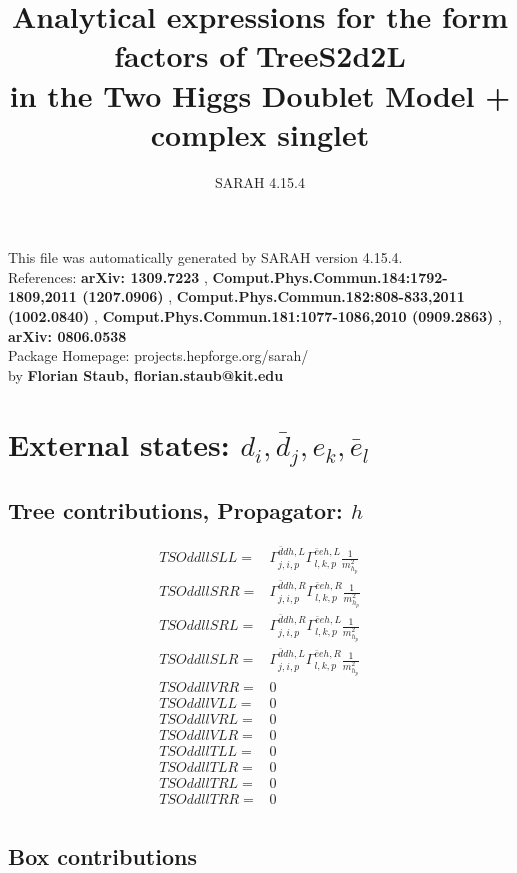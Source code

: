\documentclass[A4,landscape]{article}
\begin{document}
\title{Analytical expressions for the form factors of TreeS2d2L\\ in the Two Higgs Doublet Model + complex singlet } 
 \author{SARAH 4.15.4} 
 \maketitle 
 \vspace{10cm} 
This file was automatically generated by SARAH version 4.15.4.  \\ 
References: {\bf arXiv: 1309.7223 }, {\bf Comput.Phys.Commun.184:1792-1809,2011 (1207.0906) }, {\bf Comput.Phys.Commun.182:808-833,2011 (1002.0840) }, {\bf Comput.Phys.Commun.181:1077-1086,2010 (0909.2863) }, {\bf arXiv: 0806.0538 } \\ 
Package Homepage: projects.hepforge.org/sarah/ \\ 
by {\bf Florian Staub, florian.staub@kit.edu} 
 \pagebreak 
 \tableofcontents 
 \pagebreak 
\section{External states: ${d_{{i}}, \bar{d}_{{j}}, e_{{k}}, \bar{e}_{{l}}}$} 
\subsection{Tree contributions, Propagator: $h$} 

\begin{align} 
  TSOddllSLL= & \Gamma^{\bar{d}d h ,L}_{j, i, p} \Gamma^{\bar{e}e h ,L}_{l, k, p} \frac{1}{m^2_{h_{{p}}}} \\ 
  TSOddllSRR= & \Gamma^{\bar{d}d h ,R}_{j, i, p} \Gamma^{\bar{e}e h ,R}_{l, k, p} \frac{1}{m^2_{h_{{p}}}} \\ 
  TSOddllSRL= & \Gamma^{\bar{d}d h ,R}_{j, i, p} \Gamma^{\bar{e}e h ,L}_{l, k, p} \frac{1}{m^2_{h_{{p}}}} \\ 
  TSOddllSLR= & \Gamma^{\bar{d}d h ,L}_{j, i, p} \Gamma^{\bar{e}e h ,R}_{l, k, p} \frac{1}{m^2_{h_{{p}}}} \\ 
  TSOddllVRR= & 0 \\ 
  TSOddllVLL= & 0 \\ 
  TSOddllVRL= & 0 \\ 
  TSOddllVLR= & 0 \\ 
  TSOddllTLL= & 0 \\ 
  TSOddllTLR= & 0 \\ 
  TSOddllTRL= & 0 \\ 
  TSOddllTRR= & 0 \\ 
\end{align} 
\subsection{Box contributions} 
\end{document}
